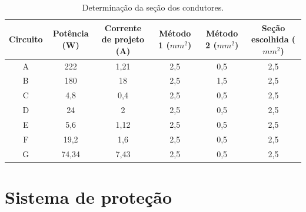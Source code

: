 \begin{table}[H]
    \centering
    \footnotesize
    \caption{Determinação da seção dos condutores.}
    \label{energia_seção}
    \begin{adjustbox}{max width = \textwidth}
        \begin{tabular}{|c|c|c|c|c|c|}
            \hline
            \rowcolor[HTML]{A8DADC}
            Circuito & Potência (W) & Corrente de projeto (A) & Método 1 ($mm^{2}$)& Método 2 ($mm^{2}$)& Seção escolhida ($mm^{2}$)
            \\ \hline
            A  & 222 & 1,21 & 2,5 & 0,5 & 2,5
            \\ \hline
             B & 180 & 18 & 2,5 & 1,5 & 2,5
            \\ \hline
             C & 4,8 & 0,4 & 2,5 & 0,5 & 2,5
            \\ \hline
             D & 24 & 2 & 2,5 & 0,5 & 2,5
            \\ \hline
             E & 5,6 & 1,12 & 2,5 & 0,5 & 2,5
            \\ \hline
             F & 19,2 & 1,6 & 2,5 & 0,5 & 2,5
            \\ \hline
             G & 74,34 & 7,43 & 2,5 & 0,5 & 2,5
            \\ \hline
        \end{tabular}
    \end{adjustbox}
\end{table}



\section{Sistema de proteção}


